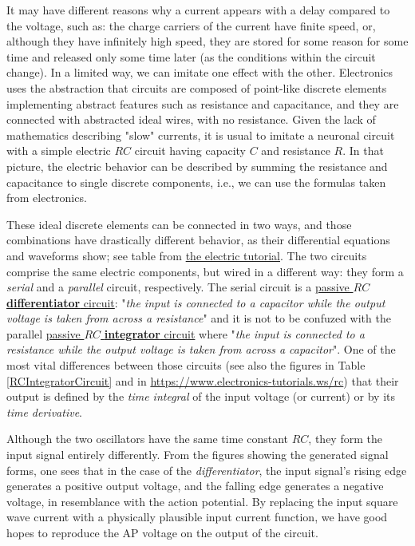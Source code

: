 %
It may have different reasons why a current appears with a delay compared
to the voltage, such as: the charge carriers of the current have finite
speed, or, although they have infinitely high speed, they are stored
for some reason for some time and released only some time later (as
the conditions within the circuit change). In a limited way, we can
imitate one effect with the other. Electronics uses the abstraction that circuits are composed of 
point-like discrete elements implementing abstract features such as resistance and capacitance, and they are connected with abstracted ideal wires, with no resistance. 
Given the lack of mathematics describing
"slow" currents, it is usual to imitate a neuronal circuit
with a simple electric $RC$ circuit having capacity $C$ and resistance $R$.
In that picture, the electric behavior
can be described by summing the resistance and capacitance to single discrete components, i.e., we can use the formulas taken from electronics. 


These ideal discrete elements
	can be connected in two ways,
	and those combinations have drastically different behavior, as their differential equations and waveforms show;
 see table %
  from \href{https://www.electronics-tutorials.ws/rc}{the electric tutorial}.
The two circuits comprise the same electric components, but wired in a different way:
they form a \textit{serial} and a \textit{parallel} circuit, respectively.
The serial circuit is a
\href{https://www.electronics-tutorials.ws/rc/rc-differentiator.html}{passive $RC$ \textbf{differentiator} circuit}:
"\textit{the input is connected to a capacitor while the output voltage is taken from across a resistance}"
and it is not to be confuzed with the parallel
\href{https://www.electronics-tutorials.ws/rc/rc-integrator.html} {passive $RC$ \textbf{integrator} circuit}
where "\textit{the input is connected to a resistance while the output voltage is taken from across a capacitor}".	
One of the most vital
differences between those circuits (see also the figures in  Table \ref{RCIntegratorCircuit} and in \url{https://www.electronics-tutorials.ws/rc})
that their output is defined by the \textit{time integral} of the input voltage (or current)
or by its \textit{time derivative}. 

 Although the two oscillators have the same time constant $RC$, they form the input signal
 entirely  differently.
 From the figures showing the generated signal forms,
 one sees that in the case of the \textit{differentiator},
 the input signal's rising edge generates a positive output voltage,
 and the falling edge generates a negative voltage,
 in resemblance with the action potential.
 By replacing the input square wave current with a physically plausible input current function,
 we have good hopes to reproduce the 
\gls{AP}
 voltage on the output of the circuit.
 
